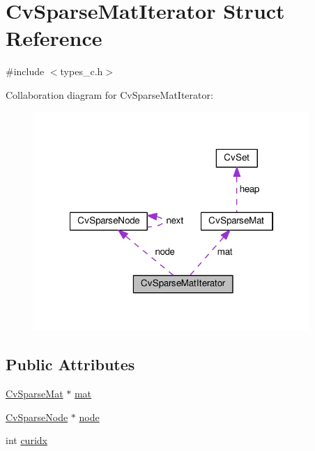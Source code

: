 \hypertarget{structCvSparseMatIterator}{\section{Cv\-Sparse\-Mat\-Iterator Struct Reference}
\label{structCvSparseMatIterator}
}


{\ttfamily \#include $<$types\-\_\-c.\-h$>$}



Collaboration diagram for Cv\-Sparse\-Mat\-Iterator\-:\nopagebreak
\begin{figure}[H]
\begin{center}
\leavevmode
\includegraphics[width=297pt]{structCvSparseMatIterator__coll__graph}
\end{center}
\end{figure}
\subsection*{Public Attributes}
\begin{DoxyCompactItemize}
\item 
\hyperlink{structCvSparseMat}{Cv\-Sparse\-Mat} $\ast$ \hyperlink{structCvSparseMatIterator_a868331ed07ea23c10f3f3597e377221e}{mat}
\item 
\hyperlink{structCvSparseNode}{Cv\-Sparse\-Node} $\ast$ \hyperlink{structCvSparseMatIterator_a4ee9bf194988e203fdb099992eff13c5}{node}
\item 
int \hyperlink{structCvSparseMatIterator_a5501b26d2dc70d7ef55238a8e35e7abb}{curidx}
\end{DoxyCompactItemize}


